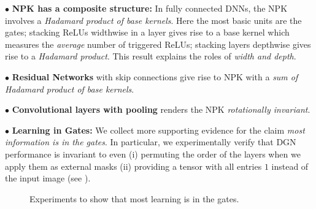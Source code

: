 $\bullet$ \textbf{NPK has a composite structure:} In fully connected DNNs, the NPK involves a \emph{ Hadamard product of base kernels}. Here the most basic units are the gates; stacking ReLUs widthwise in a layer gives rise to a base kernel which measures the \emph{average} number of triggered ReLUs; stacking layers depthwise gives rise to a \emph{Hadamard product}. This result explains the roles of \emph{width and depth}.

$\bullet$ \textbf{Residual Networks} with skip connections give rise to NPK with a \emph{ sum of Hadamard product of base kernels}. 

$\bullet$ \textbf{Convolutional layers with pooling} renders the NPK \emph{rotationally invariant}.

$\bullet$ \textbf{Learning in Gates:} We collect more supporting evidence for the claim \emph{most information is in the gates}. In particular, we experimentally verify that DGN performance is invariant to even (i) permuting the order of the layers when we apply them as external masks (ii) providing a tensor with all entries $1$ instead of the input image (see ). %
\FloatBarrier
\begin{figure}[h]
\centering
{}
\caption{ Experiments to show that most learning is in the gates.}
\label{fig:permute}
\end{figure}


